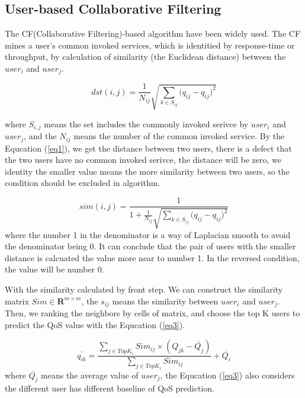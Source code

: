 \documentclass[conference]{IEEEtran}
\begin{document}
\subsection{User-based Collaborative Filtering}
The CF(Collaborative Filtering)-based algorithm have been widely used. The CF mines a user's common invoked services, which is identitied by response-time or throughput, by calculation of similarity (the Euclidean distance) between the $user_i$ and $user_j$.

\begin{equation}
dst(i,j)=\frac{1}{
  N_{ij}}\sqrt{\sum_{k \in S_{ij}}{(q_{ij}-q_{ij}})^{2}
} \label{eq1}
\end{equation}

where $S_{i,j}$ means the set includes the commonly invoked serivce by $user_{i}$ and $user_{j}$, and the $N_{ij}$ means the number of the common invoked service. By the Equcation (\ref{eq1}), we get the distance between two users, there is a defect that the two users have no common invoked serivce, the distance will be zero, we identity the smaller value  means the more similarity between two users, so the condition should be excluded in algorithm. 

\begin{equation}
sim(i,j)=\frac{1}{
  1+\frac{1}{N_{ij}}\sqrt{\sum_{k \in S_{ij}}{(q_{ij}-q_{ij}})^{2}}
}  \label{eq2}
\end{equation}
where the number 1 in the denominator is a way of Laplacian smooth to avoid the denominator being 0. It can conclude that the pair of users with the smaller distance is calcuated the value more near to number 1. In the reversed condition, the value will be number 0.

\par With the similarity calculated by front step. We can construct the similarity matrix $Sim \in \textbf{R}^{m\times m}$, the $s_{ij}$ means the similarity between $user_{i}$ and $user_{j}$. Then, we ranking the neighbors by cells of matrix, and choose the top K users to predict the QoS value with the Equcation (\ref{eq3}).

\begin{equation}
q^{'}_{ik}=\frac{
  \sum_{j \in TopK_{i}}{Sim_{ij} \times (Q_{jk}-\overline{Q_{j}})}
  }{
  \sum_{j \in TopK_{i}}{Sim_{ij}}
}+\overline{Q_{i}} 
\label{eq3}
\end{equation}
where $\overline{Q_{j}}$ means the average value of $user_{j}$, the Equcation (\ref{eq3}) also considers the different user has different baseline of QoS prediction. 
\end{document}
